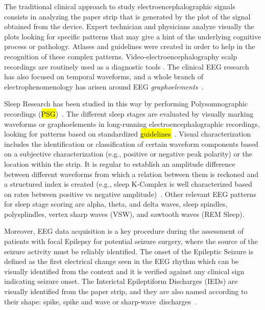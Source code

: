 \documentclass[brainsci,article,accept,moreauthors,pdftex,10pt,a4paper]{mdpi}
\begin{document}
The traditional clinical approach to study electroencephalographic signals consists in analyzing the paper strip that is generated by the plot of the signal obtained from the device.  Expert technician and physicians analyze visually the plots looking for specific patterns that may give a hint of the underlying cognitive process or pathology.   Atlases and guidelines were created in order to help in the recognition of these complex patterns.   Video-electroencephalography scalp recordings are routinely used as a diagnostic tools \citep{Giagante2003} .  The clinical EEG research has also focused on temporal waveforms, and a whole branch of electrophenomenology has arisen around EEG \textit{graphoelements}~\citep{Schomer2010}.  

Sleep Research has been studied in this way by performing Polysomnographic recordings (\hl{PSG})~\citep{Boostani2017,Rodenbeck2006}. The different sleep stages are evaluated by visually marking waveforms or graphoelements in long-running electroencephalographic recordings, looking for patterns based on standardized \hl{guidelines}~\citep{Dimitriadis2018}. Visual characterization includes the identification or classification of certain waveform components based on a subjective characterization (e.g., positive or negative peak polarity) or the location within the strip.  It is regular to establish an amplitude difference between different waveforms from which a relation between them is reckoned and a structured index is created (e.g., sleep K-Complex is well characterized based on rates between positive vs negative amplitude)~\citep{Uchida1999}.  Other relevant EEG patterns for sleep stage scoring are alpha, theta, and delta waves, sleep spindles, polysplindles, vertex sharp waves (VSW), and sawtooth waves (REM Sleep).

Moreover, EEG data acquisition is a key procedure during the assessment of patients with focal Epilepsy for potential seizure surgery, where the source of the seizure activity must be reliably identified. The onset of the Epileptic Seizure is defined as the first electrical change seen in the EEG rhythm which can be visually identified from the context and it is verified against any clinical sign indicating seizure onset.  The Interictal Epileptiform Discharges (IEDs) are visually identified from the paper strip, and they are also named according to their shape: spike, spike and wave or sharp-wave~discharges~\citep{EEGIntro}.  
\end{document}
